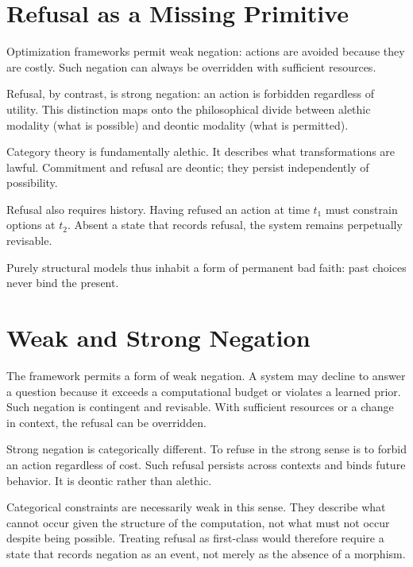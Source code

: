 \documentclass[11pt]{article}
\begin{document}
\section{Refusal as a Missing Primitive}

Optimization frameworks permit weak negation: actions are avoided because they
are costly. Such negation can always be overridden with sufficient resources.

Refusal, by contrast, is strong negation: an action is forbidden regardless of
utility. This distinction maps onto the philosophical divide between alethic
modality (what is possible) and deontic modality (what is permitted).

Category theory is fundamentally alethic. It describes what transformations are
lawful. Commitment and refusal are deontic; they persist independently of
possibility.

Refusal also requires history. Having refused an action at time $t_1$ must
constrain options at $t_2$. Absent a state that records refusal, the system
remains perpetually revisable.

Purely structural models thus inhabit a form of permanent bad faith: past
choices never bind the present.

\section{Weak and Strong Negation}

The framework permits a form of weak negation. A system may decline to answer a
question because it exceeds a computational budget or violates a learned prior.
Such negation is contingent and revisable. With sufficient resources or a change
in context, the refusal can be overridden.

Strong negation is categorically different. To refuse in the strong sense is to
forbid an action regardless of cost. Such refusal persists across contexts and
binds future behavior. It is deontic rather than alethic.

Categorical constraints are necessarily weak in this sense. They describe what
cannot occur given the structure of the computation, not what must not occur
despite being possible. Treating refusal as first-class would therefore require
a state that records negation as an event, not merely as the absence of a
morphism.
\end{document}
